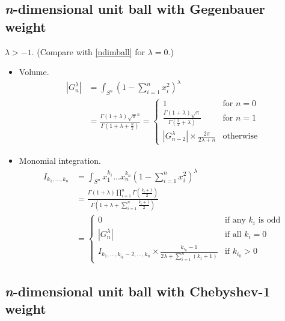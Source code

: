 \documentclass[draft]{scrartcl}
\begin{document}
\subsection*{\textit{n}-dimensional unit ball with Gegenbauer weight}
  $\lambda > -1.$ (Compare with \eqref{ndimball} for $\lambda = 0$.)
\begin{itemize}
  \item Volume.
  \[
    \begin{split}
    |G_n^{\lambda}|
      &= \int_{S^n} \left(1 - \sum_{i=1}^n x_i^2\right)^\lambda\\
      &= \frac{
        \Gamma(1+\lambda)\sqrt{\pi}^n
      }{
        \Gamma\left(1+\lambda + \frac{n}{2}\right)
      }
      = \begin{cases}
        1&\text{for $n=0$}\\
        \frac{\Gamma(1+\lambda)\sqrt{\pi}}{\Gamma\left(\frac{3}{2} + \lambda\right)}&\text{for $n=1$}\\
        |G_{n-2}^{\lambda}|\times \frac{2\pi}{2\lambda + n}&\text{otherwise}
      \end{cases}
    \end{split}
  \]

  \item Monomial integration.
  \[
    \begin{split}
    I_{k_1,\dots,k_n}
      &= \int_{S^n} x_1^{k_1}\dots x_n^{k_n} \left(1 - \sum_{i=1}^n
      x_i^2\right)^\lambda\\
      &= \frac{
        \Gamma(1+\lambda)\prod_{i=1}^n \Gamma\left(\frac{k_i+1}{2}\right)
      }{
        \Gamma\left(1+\lambda + \sum_{i=1}^n \frac{k_i+1}{2}\right)
      }\\
      &= \begin{cases}
        0&\text{if any $k_i$ is odd}\\
        |G_n^{\lambda}|&\text{if all $k_i=0$}\\
        I_{k_1,\dots,k_{i_0}-2,\dots,k_n} \times \frac{k_{i_0}-1}{2\lambda + \sum_{i=1}^n(k_i+1)}&\text{if $k_{i_0} > 0$}
      \end{cases}
    \end{split}
  \]
\end{itemize}


\subsection*{\textit{n}-dimensional unit ball with Chebyshev-1 weight}
\end{document}
